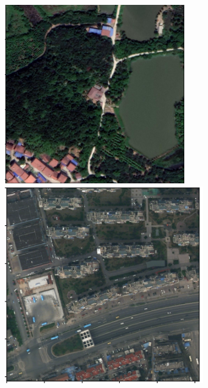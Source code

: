 \documentclass{article}
\begin{document}
\begin{multicols}{2}
\begin{figure}[H]
\begin{minipage}{0.48\linewidth}
			\end{minipage}
			\begin{minipage}{0.48\linewidth}
				\centering
				\includegraphics[width=1\linewidth]{image/rural_4.png}
				
			\end{minipage}

			\label{fig:dataset_rural_image1}

			\hfill

			\begin{minipage}{0.48\linewidth}
				\centering
				\includegraphics[width=1\linewidth]{image/urban_1.png}


\end{minipage}
\end{figure}
\end{multicols}
\end{document}
